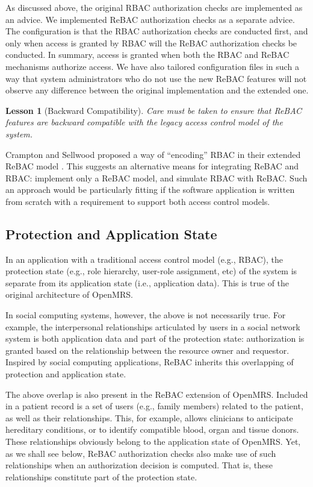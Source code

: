 \documentclass{acm_proc_article-sp}
\newtheorem{lesson}{Lesson}
\begin{document}
As discussed above, the original RBAC authorization checks are
implemented as an advice. We implemented ReBAC authorization checks as
a separate advice.  The configuration is that the RBAC authorization
checks are conducted first, and only when access is granted by RBAC
will the ReBAC authorization checks be conducted. In summary, access
is granted when both the RBAC and ReBAC mechanisms authorize access.
We have also tailored configuration files in such a way that system
administrators who do not use the new ReBAC features will not observe
any difference between the original implementation and the extended
one.
\begin{lesson}[Backward Compatibility]
Care must be taken to ensure that ReBAC features are backward
compatible with the legacy access control model of the system.
\end{lesson}

Crampton and Sellwood proposed a way of ``encoding'' RBAC in their
extended ReBAC model \cite{Crampton-Sellwood:2014}.  This suggests an
alternative means for integrating ReBAC and RBAC: implement only a
ReBAC model, and simulate RBAC with ReBAC.  Such an approach would be
particularly fitting if the software application is written from
scratch with a requirement to support both access control models.

\subsection{Protection and Application State}
\label{sec-prot-state}

In an application with a traditional access control model (e.g.,
RBAC), the protection state (e.g., role hierarchy, user-role
assignment, etc) of the system is separate from its application state
(i.e., application data).  This is true of the original architecture
of OpenMRS.

In social computing systems, however, the above is not necessarily
true.  For example, the interpersonal relationships articulated by
users in a social network system is both application data and part of
the protection state: authorization is granted based on the
relationship between the resource owner and requestor.  Inspired by
social computing applications, ReBAC inherits this overlapping of
protection and application state.

The above overlap is also present in the ReBAC extension of OpenMRS.
Included in a patient record is a set of users (e.g., family members)
related to the patient, as well as their relationships.  This, for
example, allows clinicians to anticipate hereditary conditions, or to
identify compatible blood, organ and tissue donors.  These
relationships obviously belong to the application state of OpenMRS.
Yet, as we shall see below, ReBAC authorization checks also make use
of such relationships when an authorization decision is computed.
That is, these relationships constitute part of the protection state.
\end{document}
